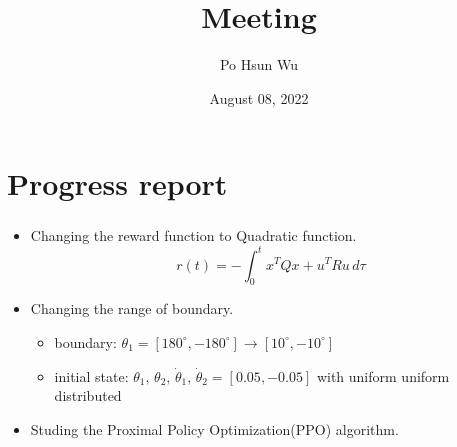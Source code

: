 \documentclass{beamer}
\date{August 08, 2022}
\title{Meeting}
\author{Po Hsun Wu}
\begin{document}
    \maketitle

    \section{Progress report}
    \begin{frame}
        \frametitle{\secname}

        \begin{itemize}
            \item Changing the reward function to Quadratic function.
            $$r(t) = -\int^t_0 x^TQx + u^TRu \, d\tau $$
            \item Changing the range of boundary.
            \begin{itemize}
                \item boundary: $ \theta_1=[180^\circ, -180^\circ] \rightarrow [10^\circ, -10^\circ] $
                \item initial state: $ \theta_1, \, \theta_2, \, \dot{\theta}_1, \, \dot{\theta}_2 = [0.05, -0.05]$ with uniform uniform distributed
            \end{itemize}
            \item Studing the Proximal Policy Optimization(PPO) algorithm.
        \end{itemize}
    \end{frame}
\end{document}
